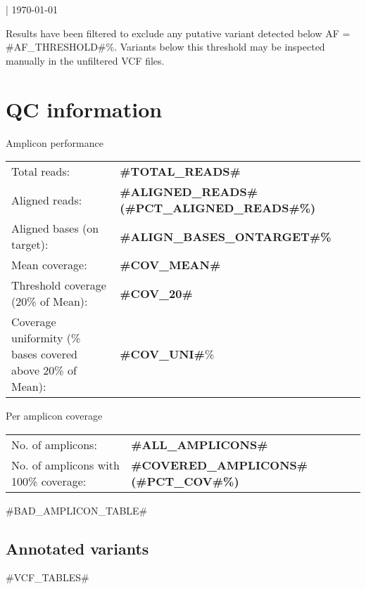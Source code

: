 \documentclass[11pt]{article}
\newcommand{\lightfont}{\fontseries{l}\selectfont}
\newcommand{\mediumfont}{\fontseries{m}\selectfont}
\renewcommand{\arraystretch}{1.5}
\begin{document}
\noindent
{\fontsize{16pt}{16pt}\selectfont {}}

\medskip
\noindent
{\lightfont {#PANEL#} | \today}

\medskip
\noindent Results have been filtered to exclude any putative variant detected below AF = {{#AF_THRESHOLD#}}\%. Variants below this threshold may be inspected manually in the unfiltered VCF files.

\section{QC information}

\begin{multicols}{2}
\noindent
{\color{darkblue1} \fontsize{14pt}{14pt}\selectfont Amplicon performance}\\

\noindent
\lightfont
{}
\begin{tabularx}{\columnwidth}{X l}

Total reads: & \textbf{{#TOTAL_READS#}} \\
Aligned reads: & \textbf{{#ALIGNED_READS#}} \textbf{({#PCT_ALIGNED_READS#}\%)} \\
Aligned bases (on target):& \textbf{{#ALIGN_BASES_ONTARGET#}\%} \\
Mean coverage:& \textbf{{#COV_MEAN#}} \\
Threshold coverage (20\% of Mean): & \textbf{{#COV_20#}} \\
Coverage uniformity (\% bases covered above 20\% of Mean): & \textbf{{#COV_UNI#}}\%  \\
\end{tabularx}

\columnbreak

\noindent
\mediumfont
{\color{darkblue1} \fontsize{14pt}{14pt}\selectfont  Per amplicon coverage}\\

\noindent
\lightfont
{}
\begin{tabularx}{\columnwidth}{X l}

No. of amplicons:& \textbf{{{#ALL_AMPLICONS#}}} \\
No. of amplicons with 100\% coverage:& \textbf{{#COVERED_AMPLICONS#} ({#PCT_COV#}\%)} \\
\end{tabularx}
\end{multicols}


{#BAD_AMPLICON_TABLE#}

\newpage
{}
\setlength{\headsep}{0.5cm}

\begin{landscape}
\renewcommand{\arraystretch}{1.4}
    \section{Annotated variants}
    \footnotesize
    {#VCF_TABLES#}
\end{landscape}
\end{document}
